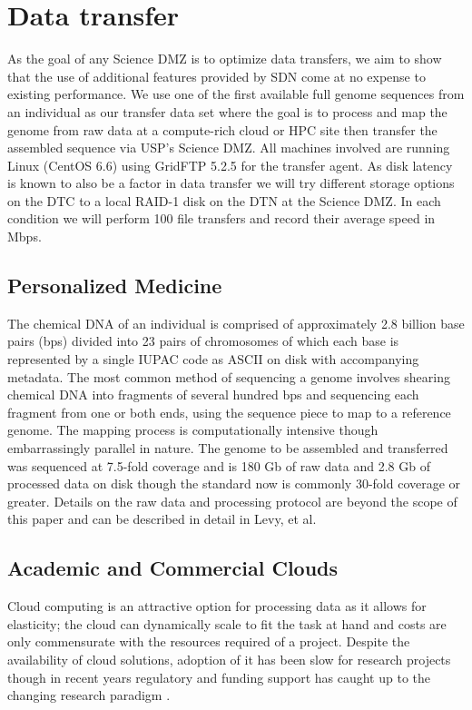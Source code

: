 \documentclass{sig-alternate-05-2015}
\begin{document}
\section{Data transfer}

As the goal of any Science DMZ is to optimize data transfers, we aim to show that the use of additional features provided by SDN come at no expense to existing performance. We use one of the first available full genome sequences from an individual as our transfer data set \cite{Levy2007} where the goal is to process and map the genome from raw data at a compute-rich cloud or HPC site then transfer the assembled sequence via USP's Science DMZ. All machines involved are running Linux (CentOS 6.6) using GridFTP 5.2.5 for the transfer agent. As disk latency is known to also be a factor in data transfer we will try different storage options on the DTC to a local RAID-1 disk on the DTN at the Science DMZ. In each condition we will perform 100 file transfers and record their average speed in Mbps.

\subsection{Personalized Medicine}

The chemical DNA of an individual is comprised of approximately 2.8 billion base pairs (bps) divided into 23 pairs of chromosomes of which each base is represented by a single IUPAC code as ASCII on disk with accompanying metadata. The most common method of sequencing a genome involves shearing chemical DNA into fragments of several hundred bps and sequencing each fragment from one or both ends, using the sequence piece to map to a reference genome. The mapping process is computationally intensive though embarrassingly parallel in nature. The genome to be assembled and transferred was sequenced at 7.5-fold coverage and is 180 Gb of raw data and 2.8 Gb of processed data on disk though the standard now is commonly 30-fold coverage or greater. Details on the raw data and processing protocol are beyond the scope of this paper and can be described in detail in Levy, et al.

\subsection{Academic and Commercial Clouds}

Cloud computing is an attractive option for processing data as it allows for elasticity; the cloud can dynamically scale to fit the task at hand and costs are only commensurate with the resources required of a project. Despite the availability of cloud solutions, adoption of it has been slow for research projects though in recent years regulatory and funding support has caught up to the changing research paradigm \cite{Stein2015}. 
\end{document}
